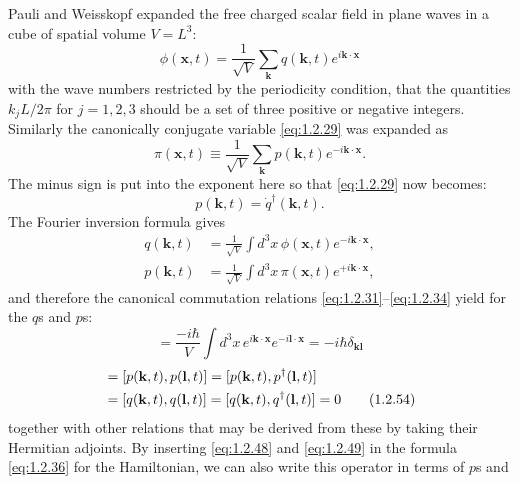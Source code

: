 Pauli and Weisskopf expanded the free charged scalar field in plane waves in
a cube of spatial volume $V=L^3$:
\begin{equation}
  \phi(\mathbf x,t)=\frac{1}{\sqrt V}\sum_{\mathbf k}
    q(\mathbf k,t)e^{i\mathbf k\cdot\mathbf x}
  \tag{1.2.48}\label{eq:1.2.48}
\end{equation}
with the wave numbers restricted by the periodicity condition, that the
quantities $k_jL/2\pi$ for $j=1,2,3$ should be a set of three positive or
negative integers. Similarly the canonically conjugate variable \eqref{eq:1.2.29} was
expanded as
\begin{equation}
  \pi(\mathbf x,t)\equiv\frac{1}{\sqrt V}\sum_{\mathbf k}
    p(\mathbf k,t)e^{-i\mathbf k\cdot\mathbf x}.
  \tag{1.2.49}\label{eq:1.2.49}
\end{equation}
The minus sign is put into the exponent here so that \eqref{eq:1.2.29} now becomes:
\begin{equation}
  p(\mathbf k,t)=\dot q^{\dagger}(\mathbf k,t).
  \tag{1.2.50}\label{eq:1.2.50}
\end{equation}
The Fourier inversion formula gives
\begin{align}
  q(\mathbf k,t)&=\frac{1}{\sqrt V}\int d^3x\,
    \phi(\mathbf x,t)e^{-i\mathbf k\cdot\mathbf x},
  \tag{1.2.51}\label{eq:1.2.51}\\
  p(\mathbf k,t)&=\frac{1}{\sqrt V}\int d^3x\,
    \pi(\mathbf x,t)e^{+i\mathbf k\cdot\mathbf x},
  \tag{1.2.52}\label{eq:1.2.52}
\end{align}
and therefore the canonical commutation relations \eqref{eq:1.2.31}--\eqref{eq:1.2.34} yield
for the $q$s and $p$s:
\begin{equation}
  [p(\mathbf k,t),q(\mathbf l,t)]
  =\frac{-i\hbar}{V}\int d^3x\,
    e^{i\mathbf k\cdot\mathbf x}e^{-i\mathbf l\cdot\mathbf x}
  =-i\hbar\delta_{\mathbf k\mathbf l}
  \tag{1.2.53}\label{eq:1.2.53}
\end{equation}
\begin{align}
  [p(\mathbf k,t),q^{\dagger}(\mathbf l,t)]
  &=[p(\mathbf k,t),p(\mathbf l,t)]
   =[p(\mathbf k,t),p^{\dagger}(\mathbf l,t)]
  \notag\\
  &=[q(\mathbf k,t),q(\mathbf l,t)]
   =[q(\mathbf k,t),q^{\dagger}(\mathbf l,t)]=0
  \tag{1.2.54}\label{eq:1.2.54}
\end{align}
together with other relations that may be derived from these by taking their
Hermitian adjoints. By inserting \eqref{eq:1.2.48} and \eqref{eq:1.2.49} in the formula \eqref{eq:1.2.36}
for the Hamiltonian, we can also write this operator in terms of $p$s and
